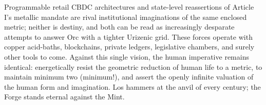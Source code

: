 \documentclass[
]{article}
\begin{document}
Programmable retail CBDC architectures and state-level reassertions of
Article I's metallic mandate are rival institutional imaginations of the
same enclosed metric; neither is destiny, and both can be read as
increasingly desparate attempts to answer Orc with a tighter Urizenic
grid. These forces operate with copper acid-baths, blockchains, private
ledgers, legislative chambers, and surely other tools to come. Against
this single vision, the human imperative remains identical:
energetically resist the geometric reduction of human life to a metric,
to maintain minimum two (minimum!), and assert the openly infinite
valuation of the human form and imagination. Los hammers at the anvil of
every century; the Forge stands eternal against the Mint.



\clearpage


\end{document}
